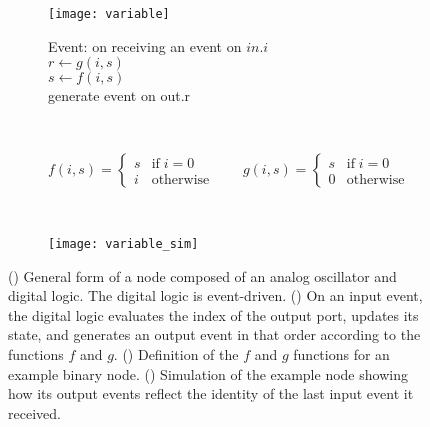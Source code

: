 \documentclass[10pt]{article}
\begin{document}
\begin{figure}[h]
 \centering
     \begin{subfigure}[b]{0.4\textwidth}
     \texttt{[image: variable]} 
     \subcaption{}
     \label{fig:variable_a}
   \end{subfigure}
   \quad\quad\quad
   \begin{subfigure}[b]{0.4\textwidth}
     \begin{minipage}{2.3in}
     Event: on receiving an event on $in.i$\\
     \hspace*{0.2in} $r \leftarrow g(i,s)$ \\
     \hspace*{0.2in} $s \leftarrow f(i,s)$\\
     \hspace*{0.2in} generate event on out.r
     \end{minipage}
     \subcaption{}
     \label{fig:variable_b}
   \end{subfigure}
   \\
   \begin{subfigure}[b]{0.6\textwidth}
     \begin{minipage}{2.3in}
       \begin{equation*}
         f(i,s) =
         \begin{cases}
           s & \text{if}\; i=0 \\
           i       & \text{otherwise} 
         \end{cases}
         \quad\quad
         g(i,s) =
         \begin{cases}
           s & \text{if}\; i=0 \\
           0       & \text{otherwise} 
         \end{cases}
         \label{eq:toy}
       \end{equation*}
     \end{minipage}
     \subcaption{}
     \label{fig:variable_c}
     \end{subfigure} \\
     \begin{subfigure}[b]{0.6\textwidth}
       
       \texttt{[image: variable\_sim]} 
       \subcaption{}
       \label{fig:variable_d}
     \end{subfigure}
     

   \caption{() General form of a node composed of an analog oscillator and digital logic. The digital logic is event-driven. () On an input event, the digital logic evaluates the index of the output port, updates its state, and generates an output event in that order according to the functions $f$ and $g$. () Definition of the $f$ and $g$ functions for an example binary node. () Simulation of the example node showing how its output events reflect the identity of the last input event it received.}
\label{fig:variable}
\end{figure}	
\end{document}

